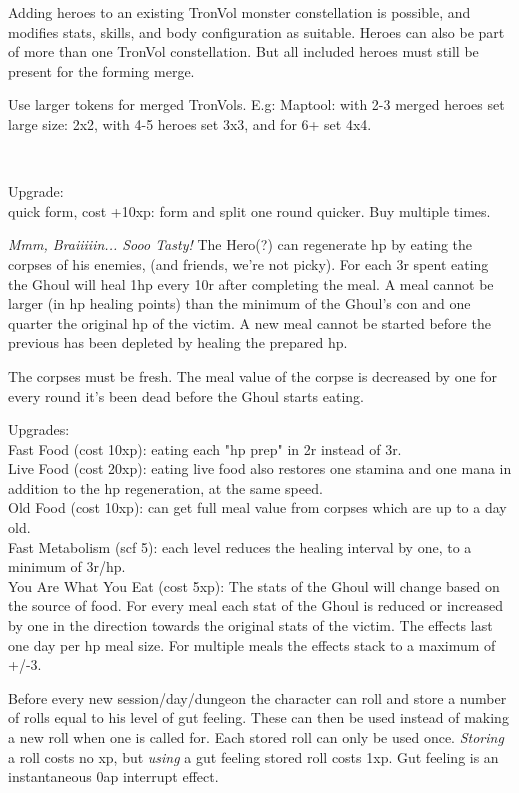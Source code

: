 Adding heroes to an existing TronVol monster constellation is possible, and modifies stats, skills, and body configuration as suitable. Heroes can also be part of more than one TronVol constellation. But all included heroes must still be present for the forming merge.

Use larger tokens for merged TronVols. E.g: Maptool: with 2-3 merged heroes set large size: 2x2, with 4-5 heroes set 3x3, and for 6+ set 4x4.

\

Upgrade:\\
quick form, cost +10xp: form and split one round quicker. Buy multiple times.


 \emph{Mmm, Braiiiiin... Sooo Tasty!}
The Hero(?) can regenerate hp by eating the corpses of his enemies, (and friends, we're not picky). For each 3r spent eating the Ghoul will heal 1hp every 10r after completing the meal. A meal cannot be larger (in hp healing points) than the minimum of the Ghoul's con and one quarter the original hp of the victim. A new meal cannot be started before the previous has been depleted by healing the prepared hp.

The corpses must be fresh. The meal value of the corpse is decreased by one for every round it's been dead before the Ghoul starts eating.

Upgrades:\\
Fast Food (cost 10xp): eating each "hp prep" in 2r instead of 3r.\\
Live Food (cost 20xp): eating live food also restores one stamina and one mana in addition to the hp regeneration, at the same speed.\\
Old Food (cost 10xp): can get full meal value from corpses which are up to a day old. \\
Fast Metabolism (scf 5): each level reduces the healing interval by one, to a minimum of 3r/hp.\\
You Are What You Eat (cost 5xp): The stats of the Ghoul will change based on the source of food. For every meal each stat of the Ghoul is reduced or increased by one in the direction towards the original stats of the victim. The effects last one day per hp meal size. For multiple meals the effects stack to a maximum of +/-3.


 Before every new session/day/dungeon the character can roll and store a number of rolls equal to his level of gut feeling. These can then be used instead of making a new roll when one is called for. Each stored roll can only be used once. \emph{Storing} a roll costs no xp, but \emph{using} a gut feeling stored roll costs 1xp. Gut feeling is an instantaneous 0ap interrupt effect.

